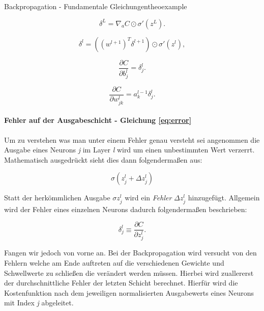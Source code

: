 \begin{mytheo}{Backpropagation - Fundamentale Gleichungen}{theoexample} \label{theo:zus}

\begin{equation} \label{eq:error}
\delta^L = \nabla_a C \odot \sigma'(z^L).
\end{equation}

\begin{equation} \label{eq:recError}
\delta^l = ((w^{l+1})^T \delta^{l+1}) \odot \sigma'(z^l),
\end{equation}

\begin{equation}
\frac{\partial C}{\partial b^l_j} = \delta^l_j.
\end{equation}

\begin{equation}
\frac{\partial C}{\partial w^l_{jk}} = a^{l-1}_k \delta^l_j.
\end{equation}

\end{mytheo}


\paragraph{Fehler auf der Ausgabeschicht - Gleichung \ref{eq:error}}
Um zu verstehen was man unter einem Fehler genau versteht sei angenommen die Ausgabe eines Neurons \emph{j} im Layer \emph{l} wird um einen unbestimmten Wert verzerrt. Mathematisch ausgedrückt sieht dies dann folgendermaßen aus: 

\begin{equation}
\sigma(z^l_j+\Delta z^l_j)
\end{equation}

Statt der herkömmlichen Ausgabe $\sigma{z^l_j}$ wird ein \emph{Fehler} $\Delta z^l_j$ hinzugefügt. Allgemein wird der Fehler eines einzelnen Neurons dadurch folgendermaßen beschrieben: 

\begin{equation}
\delta^l_j \equiv \frac{\partial C}{\partial z^l_j}.
\end{equation}

Fangen wir jedoch von vorne an. Bei der Backpropagation wird versucht von den Fehlern welche am Ende auftreten auf die verschiedenen Gewichte und Schwellwerte zu schließen die verändert werden müssen. Hierbei wird zuallererst der durchschnittliche Fehler der letzten Schicht berechnet. Hierfür wird die Kostenfunktion nach dem jeweiligen normalisierten Ausgabewerts eines Neurons mit Index \emph{j} abgeleitet.

